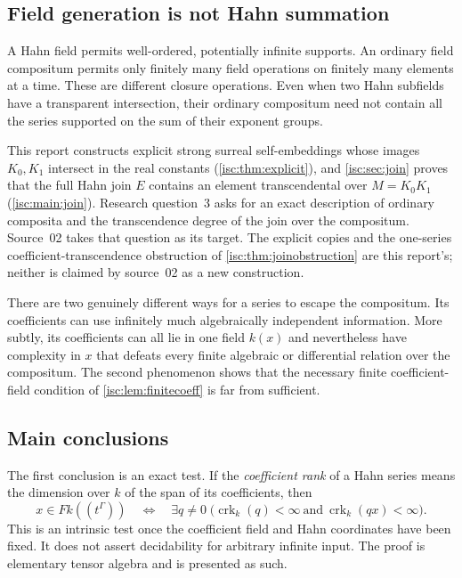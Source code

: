 \documentclass[11pt,letterpaper]{article}
\theoremstyle{definition}
\theoremstyle{remark}
\newcommand{\crk}{\operatorname{crk}}%
\numberwithin{equation}{section}
\begin{document}
\subsection{Field generation is not Hahn summation}

A Hahn field permits well-ordered, potentially infinite supports. An
ordinary field compositum permits only finitely many field operations on
finitely many elements at a time. These are different closure operations.
Even when two Hahn subfields have a transparent intersection, their
ordinary compositum need not contain all the series supported on the sum
of their exponent groups.

This report constructs explicit strong surreal self-embeddings whose images
$K_0,K_1$ intersect in the real constants (\cref{isc:thm:explicit}), and
\cref{isc:sec:join} proves that the full Hahn join $E$ contains an element
transcendental over $M=K_0K_1$ (\cref{isc:main:join}). Research question~3
asks for an exact description of ordinary composita and the transcendence
degree of the join over the compositum. Source~02 takes that question as
its target. The explicit copies and the one-series coefficient-transcendence
obstruction of \cref{isc:thm:joinobstruction} are this report's; neither is
claimed by source~02 as a new construction.

There are two genuinely different ways for a series to escape the
compositum. Its coefficients can use infinitely much algebraically
independent information. More subtly, its coefficients can all lie in one
field $k(x)$ and nevertheless have complexity in $x$ that defeats every
finite algebraic or differential relation over the compositum. The second
phenomenon shows that the necessary finite coefficient-field condition of
\cref{isc:lem:finitecoeff} is far from sufficient.

\subsection{Main conclusions}

The first conclusion is an exact test. If the \emph{coefficient rank} of a
Hahn series means the dimension over $k$ of the span of its coefficients,
then
\begin{equation}\label{isc:cp:eq:introtest}
 x\in F k((t^\Gamma))
 \quad\Longleftrightarrow\quad
 \exists q\ne0\;\bigl(\crk_k(q)<\infty\ \text{and}\ \crk_k(qx)<\infty\bigr).
\end{equation}
This is an intrinsic test once the coefficient field and Hahn coordinates
have been fixed. It does not assert decidability for arbitrary infinite
input. The proof is elementary tensor algebra and is presented as such.
\end{document}
